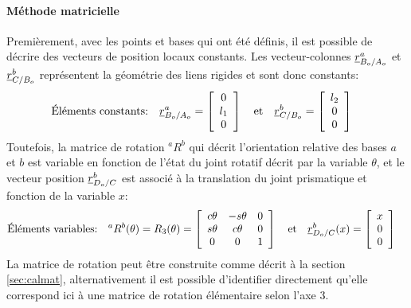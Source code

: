 \paragraph{Méthode matricielle}

Premièrement, avec les points et bases qui ont été définis, il est possible de décrire des vecteurs de position locaux constants. Les vecteur-colonnes $\underline{r}_{B_o/A_o}^a$ et $\underline{r}_{C/B_o}^b$ représentent la géométrie des liens rigides et sont donc constants:
\begin{align}
\text{Éléments constants:}& \quad \underline{r}_{B_o/A_o}^a =  \left[ \begin{array}{c} 
0 \\ l_1 \\ 0
\end{array} \right]  \quad \text{et} \quad  \underline{r}_{C/B_o}^b =  \left[ \begin{array}{c} 
l_2 \\ 0 \\ 0
\end{array} \right] 
\end{align} 
Toutefois, la matrice de rotation ${}^aR^b$ qui décrit l'orientation relative des bases $a$ et $b$ est variable en fonction de l'état du joint rotatif décrit par la variable $\theta$, et le vecteur position $\underline{r}_{D_o/C}^b$ est associé à la translation du joint prismatique et fonction de la variable $x$:
\begin{align}
\text{Éléments variables:}& \quad {}^aR^b(\theta)= R_3(\theta) = \left[ \begin{array}{c c c}
	c\theta & -s\theta & 0 \\
	s\theta & c\theta & 0 \\
	0 & 0 & 1 
\end{array}  \right]  \quad \text{et} \quad  \underline{r}_{D_o/C}^b(x) =  \left[ \begin{array}{c} 
x \\ 0 \\ 0
\end{array} \right] 
\end{align} 
La matrice de rotation peut être construite comme décrit à la section \ref{sec:calmat}, alternativement il est possible d’identifier directement qu'elle correspond ici à une matrice de rotation élémentaire selon l'axe 3.

